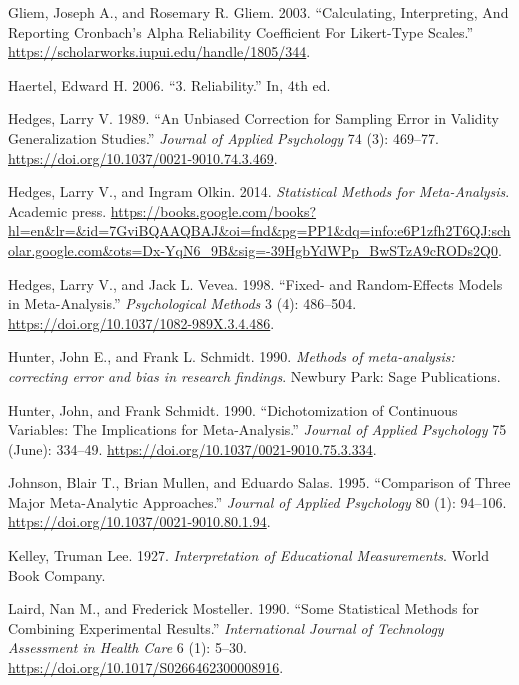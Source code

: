 \documentclass[
  letterpaper,
  DIV=11,
  numbers=noendperiod]{scrreprt}
\newlength{\cslhangindent}
\newlength{\cslentryspacingunit} %
\newenvironment{CSLReferences}[2] %
 {%
  \setlength{\parindent}{0pt}
  \ifodd #1
  \let\oldpar\par
  \def\par{\hangindent=\cslhangindent\oldpar}
  \fi
  \setlength{\parskip}{#2\cslentryspacingunit}
 }%
 {}
\begin{document}
\begin{CSLReferences}{1}{0}
\leavevmode{}%
Gliem, Joseph A., and Rosemary R. Gliem. 2003. {``Calculating,
Interpreting, And Reporting Cronbach{'}s Alpha Reliability Coefficient
For Likert-Type Scales.''}
\url{https://scholarworks.iupui.edu/handle/1805/344}.

\leavevmode{}%
Haertel, Edward H. 2006. {``3. Reliability.''} In, 4th ed.

\leavevmode{}%
Hedges, Larry V. 1989. {``An Unbiased Correction for Sampling Error in
Validity Generalization Studies.''} \emph{Journal of Applied Psychology}
74 (3): 469--77. \url{https://doi.org/10.1037/0021-9010.74.3.469}.

\leavevmode{}%
Hedges, Larry V., and Ingram Olkin. 2014. \emph{Statistical Methods for
Meta-Analysis}. Academic press.
\url{https://books.google.com/books?hl=en\&lr=\&id=7GviBQAAQBAJ\&oi=fnd\&pg=PP1\&dq=info:e6P1zfh2T6QJ:scholar.google.com\&ots=Dx-YqN6_9B\&sig=-39HgbYdWPp_BwSTzA9cRODs2Q0}.

\leavevmode{}%
Hedges, Larry V., and Jack L. Vevea. 1998. {``Fixed- and Random-Effects
Models in Meta-Analysis.''} \emph{Psychological Methods} 3 (4):
486--504. \url{https://doi.org/10.1037/1082-989X.3.4.486}.

\leavevmode{}%
Hunter, John E., and Frank L. Schmidt. 1990. \emph{Methods of
meta-analysis: correcting error and bias in research findings}. Newbury
Park: Sage Publications.

\leavevmode{}%
Hunter, John, and Frank Schmidt. 1990. {``Dichotomization of Continuous
Variables: The Implications for Meta-Analysis.''} \emph{Journal of
Applied Psychology} 75 (June): 334--49.
\url{https://doi.org/10.1037/0021-9010.75.3.334}.

\leavevmode{}%
Johnson, Blair T., Brian Mullen, and Eduardo Salas. 1995. {``Comparison
of Three Major Meta-Analytic Approaches.''} \emph{Journal of Applied
Psychology} 80 (1): 94--106.
\url{https://doi.org/10.1037/0021-9010.80.1.94}.

\leavevmode{}%
Kelley, Truman Lee. 1927. \emph{Interpretation of Educational
Measurements}. World Book Company.

\leavevmode{}%
Laird, Nan M., and Frederick Mosteller. 1990. {``Some Statistical
Methods for Combining Experimental Results.''} \emph{International
Journal of Technology Assessment in Health Care} 6 (1): 5--30.
\url{https://doi.org/10.1017/S0266462300008916}.


\end{CSLReferences}
\end{document}
